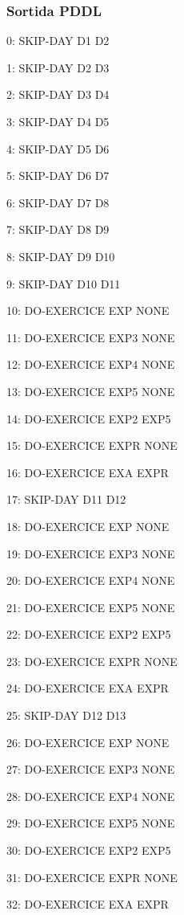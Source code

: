 \documentclass[a4paper,12pt, UTF-8]{article}
\begin{document}
\newpage

\subsubsection{Sortida PDDL}
\setlength{\parskip}{0em}
    0: SKIP-DAY D1 D2
    
    1: SKIP-DAY D2 D3
    
    2: SKIP-DAY D3 D4
    
    3: SKIP-DAY D4 D5
    
    4: SKIP-DAY D5 D6
    
    5: SKIP-DAY D6 D7
    
    6: SKIP-DAY D7 D8
    
    7: SKIP-DAY D8 D9
    
    8: SKIP-DAY D9 D10
    
    9: SKIP-DAY D10 D11
    
    10: DO-EXERCICE EXP NONE
    
    11: DO-EXERCICE EXP3 NONE
    
    12: DO-EXERCICE EXP4 NONE
    
    13: DO-EXERCICE EXP5 NONE
    
    14: DO-EXERCICE EXP2 EXP5
    
    15: DO-EXERCICE EXPR NONE
    
    16: DO-EXERCICE EXA EXPR
    
    17: SKIP-DAY D11 D12
    
    18: DO-EXERCICE EXP NONE
    
    19: DO-EXERCICE EXP3 NONE
    
    20: DO-EXERCICE EXP4 NONE
    
    21: DO-EXERCICE EXP5 NONE
    
    22: DO-EXERCICE EXP2 EXP5
    
    23: DO-EXERCICE EXPR NONE
    
    24: DO-EXERCICE EXA EXPR
    
    25: SKIP-DAY D12 D13
    
    26: DO-EXERCICE EXP NONE
    
    27: DO-EXERCICE EXP3 NONE
    
    28: DO-EXERCICE EXP4 NONE
    
    29: DO-EXERCICE EXP5 NONE
    
    30: DO-EXERCICE EXP2 EXP5
    
    31: DO-EXERCICE EXPR NONE
    
    32: DO-EXERCICE EXA EXPR
    
\end{document}
